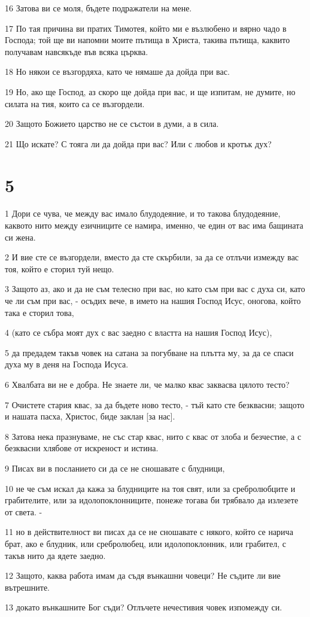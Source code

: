 \par 16 Затова ви се моля, бъдете подражатели на мене.
\par 17 По тая причина ви пратих Тимотея, който ми е възлюбено и вярно чадо в Господа; той ще ви напомни моите пътища в Христа, такива пътища, каквито получавам навсякъде във всяка църква.
\par 18 Но някои се възгордяха, като че нямаше да дойда при вас.
\par 19 Но, ако ще Господ, аз скоро ще дойда при вас, и ще изпитам, не думите, но силата на тия, които са се възгордели.
\par 20 Защото Божието царство не се състои в думи, а в сила.
\par 21 Що искате? С тояга ли да дойда при вас? Или с любов и кротък дух?

\chapter{5}

\par 1 Дори се чува, че между вас имало блудодеяние, и то такова блудодеяние, каквото нито между езичниците се намира, именно, че един от вас има бащината си жена.
\par 2 И вие сте се възгордели, вместо да сте скърбили, за да се отлъчи измежду вас тоя, който е сторил туй нещо.
\par 3 Защото аз, ако и да не съм телесно при вас, но като съм при вас с духа си, като че ли съм при вас, - осъдих вече, в името на нашия Господ Исус, оногова, който така е сторил това,
\par 4 (като се събра моят дух с вас заедно с властта на нашия Господ Исус),
\par 5 да предадем такъв човек на сатана за погубване на плътта му, за да се спаси духа му в деня на Господа Исуса.
\par 6 Хвалбата ви не е добра. Не знаете ли, че малко квас заквасва цялото тесто?
\par 7 Очистете стария квас, за да бъдете ново тесто, - тъй като сте безквасни; защото и нашата пасха, Христос, биде заклан [за нас].
\par 8 Затова нека празнуваме, не със стар квас, нито с квас от злоба и безчестие, а с безквасни хлябове от искреност и истина.
\par 9 Писах ви в посланието си да се не сношавате с блудници,
\par 10 не че съм искал да кажа за блудниците на тоя свят, или за сребролюбците и грабителите, или за идолопоклонниците, понеже тогава би трябвало да излезете от света. -
\par 11 но в действителност ви писах да се не сношавате с някого, който се нарича брат, ако е блудник, или сребролюбец, или идолопоклонник, или грабител, с такъв нито да ядете заедно.
\par 12 Защото, каква работа имам да съдя вънкашни човеци? Не съдите ли вие вътрешните.
\par 13 докато вънкашните Бог съди? Отлъчете нечестивия човек изпомежду си.

